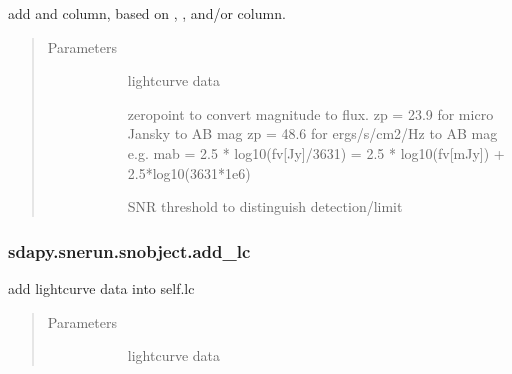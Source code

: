 \documentclass[letterpaper,10pt,english]{sphinxmanual}
\begin{document}
\begin{fulllineitems}
\begin{fulllineitems}
\label{\detokenize{generated/sdapy.snerun.snobject.add_flux:sdapy.snerun.snobject.add_flux}}
add  and  column, based on , , and/or  column.
\begin{quote}\begin{description}
\item[{Parameters}] \leavevmode\begin{description}
\item[{}] \leavevmode{[}\sphinxtitleref{panda.dataframe}{]}
lightcurve data

\item[{}] \leavevmode{[}\sphinxtitleref{float}{]}
zeropoint to convert magnitude to flux.
zp = 23.9 for micro Jansky to AB mag
zp = 48.6 for ergs/s/cm2/Hz to AB mag
e.g. mab = \sphinxhyphen{}2.5 * log10(fv{[}Jy{]}/3631) = \sphinxhyphen{}2.5 * log10(fv{[}mJy{]}) + 2.5*log10(3631*1e6)

\item[{}] \leavevmode{[}\sphinxtitleref{float}{]}
SNR threshold to distinguish detection/limit

\end{description}

\end{description}\end{quote}

\end{fulllineitems}



\subsubsection{sdapy.snerun.snobject.add\_lc}
\label{\detokenize{generated/sdapy.snerun.snobject.add_lc:sdapy-snerun-snobject-add-lc}}\label{\detokenize{generated/sdapy.snerun.snobject.add_lc::doc}}

\begin{fulllineitems}
\label{\detokenize{generated/sdapy.snerun.snobject.add_lc:sdapy.snerun.snobject.add_lc}}
add lightcurve data into self.lc
\begin{quote}\begin{description}
\item[{Parameters}] \leavevmode\begin{description}
\item[{}] \leavevmode{[}\sphinxtitleref{panda.dataframe}{]}
lightcurve data


\end{description}
\end{description}
\end{quote}
\end{fulllineitems}
\end{fulllineitems}
\end{document}
